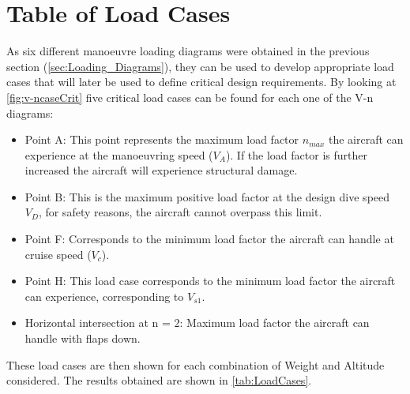 \section{Table of Load Cases}
\label{sec:Tab_LoadCase}
As six different manoeuvre loading diagrams were obtained in the previous section (\autoref{sec:Loading_Diagrams}), they can be used to develop appropriate load cases that will later be used to define critical design requirements. By looking at \autoref{fig:v-ncaseCrit} five critical load cases can be found for each one of the V-n diagrams:
\begin{itemize}
    \item Point A: This point represents the maximum load factor $n_{max}$ the aircraft can experience at the manoeuvring speed ($V_A$). If the load factor is further increased the aircraft will experience structural damage.
    \item Point B: This is the maximum positive load factor at the design dive speed $V_D$, for safety reasons, the aircraft cannot overpass this limit. 
    \item Point F: Corresponds to the minimum load factor the aircraft can handle at cruise speed ($V_c$). 
    \item Point H: This load case corresponds to the minimum load factor the aircraft can experience, corresponding to $V_{s1}$.
    \item Horizontal intersection at n = $2$: Maximum load factor the aircraft can handle with flaps down.
\end{itemize}

\noindent These load cases are then shown for each combination of Weight and Altitude considered. The results obtained are shown in \autoref{tab:LoadCases}.



